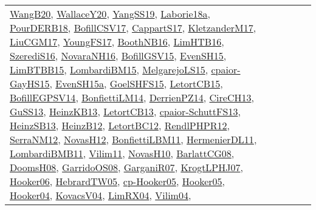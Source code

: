 {\begin{longtable}{llp{6cm}p{6cm}p{6cm}}
\href{papers/WangB20.pdf}{WangB20}\cite{WangB20}, \href{articles/WallaceY20.pdf}{WallaceY20}\cite{WallaceY20}, \href{papers/YangSS19.pdf}{YangSS19}\cite{YangSS19}, \href{papers/Laborie18a.pdf}{Laborie18a}\cite{Laborie18a}, \href{articles/PourDERB18.pdf}{PourDERB18}\cite{PourDERB18}, \href{papers/BofillCSV17.pdf}{BofillCSV17}\cite{BofillCSV17}, \href{papers/CappartS17.pdf}{CappartS17}\cite{CappartS17}, \href{papers/KletzanderM17.pdf}{KletzanderM17}\cite{KletzanderM17}, \href{papers/LiuCGM17.pdf}{LiuCGM17}\cite{LiuCGM17}, \href{papers/YoungFS17.pdf}{YoungFS17}\cite{YoungFS17}, \href{papers/BoothNB16.pdf}{BoothNB16}\cite{BoothNB16}, \href{papers/LimHTB16.pdf}{LimHTB16}\cite{LimHTB16}, \href{papers/SzerediS16.pdf}{SzerediS16}\cite{SzerediS16}, \href{articles/NovaraNH16.pdf}{NovaraNH16}\cite{NovaraNH16}, \href{papers/BofillGSV15.pdf}{BofillGSV15}\cite{BofillGSV15}, \href{papers/EvenSH15.pdf}{EvenSH15}\cite{EvenSH15}, \href{papers/LimBTBB15.pdf}{LimBTBB15}\cite{LimBTBB15}, \href{papers/LombardiBM15.pdf}{LombardiBM15}\cite{LombardiBM15}, \href{papers/MelgarejoLS15.pdf}{MelgarejoLS15}\cite{MelgarejoLS15}, \href{papers/cpaior-GayHS15.pdf}{cpaior-GayHS15}\cite{cpaior-GayHS15}, \href{articles/EvenSH15a.pdf}{EvenSH15a}\cite{EvenSH15a}, \href{articles/GoelSHFS15.pdf}{GoelSHFS15}\cite{GoelSHFS15}, \href{articles/LetortCB15.pdf}{LetortCB15}\cite{LetortCB15}, \href{papers/BofillEGPSV14.pdf}{BofillEGPSV14}\cite{BofillEGPSV14}, \href{papers/BonfiettiLM14.pdf}{BonfiettiLM14}\cite{BonfiettiLM14}, \href{papers/DerrienPZ14.pdf}{DerrienPZ14}\cite{DerrienPZ14}, \href{papers/CireCH13.pdf}{CireCH13}\cite{CireCH13}, \href{papers/GuSS13.pdf}{GuSS13}\cite{GuSS13}, \href{papers/HeinzKB13.pdf}{HeinzKB13}\cite{HeinzKB13}, \href{papers/LetortCB13.pdf}{LetortCB13}\cite{LetortCB13}, \href{papers/cpaior-SchuttFS13.pdf}{cpaior-SchuttFS13}\cite{cpaior-SchuttFS13}, \href{articles/HeinzSB13.pdf}{HeinzSB13}\cite{HeinzSB13}, \href{papers/HeinzB12.pdf}{HeinzB12}\cite{HeinzB12}, \href{papers/LetortBC12.pdf}{LetortBC12}\cite{LetortBC12}, \href{papers/RendlPHPR12.pdf}{RendlPHPR12}\cite{RendlPHPR12}, \href{papers/SerraNM12.pdf}{SerraNM12}\cite{SerraNM12}, \href{articles/NovasH12.pdf}{NovasH12}\cite{NovasH12}, \href{papers/BonfiettiLBM11.pdf}{BonfiettiLBM11}\cite{BonfiettiLBM11}, \href{papers/HermenierDL11.pdf}{HermenierDL11}\cite{HermenierDL11}, \href{papers/LombardiBMB11.pdf}{LombardiBMB11}\cite{LombardiBMB11}, \href{papers/Vilim11.pdf}{Vilim11}\cite{Vilim11}, \href{articles/NovasH10.pdf}{NovasH10}\cite{NovasH10}, \href{papers/BarlattCG08.pdf}{BarlattCG08}\cite{BarlattCG08}, \href{papers/DoomsH08.pdf}{DoomsH08}\cite{DoomsH08}, \href{articles/GarridoOS08.pdf}{GarridoOS08}\cite{GarridoOS08}, \href{papers/GarganiR07.pdf}{GarganiR07}\cite{GarganiR07}, \href{papers/KrogtLPHJ07.pdf}{KrogtLPHJ07}\cite{KrogtLPHJ07}, \href{articles/Hooker06.pdf}{Hooker06}\cite{Hooker06}, \href{papers/HebrardTW05.pdf}{HebrardTW05}\cite{HebrardTW05}, \href{papers/cp-Hooker05.pdf}{cp-Hooker05}\cite{cp-Hooker05}, \href{articles/Hooker05.pdf}{Hooker05}\cite{Hooker05}, \href{papers/Hooker04.pdf}{Hooker04}\cite{Hooker04}, \href{papers/KovacsV04.pdf}{KovacsV04}\cite{KovacsV04}, \href{papers/LimRX04.pdf}{LimRX04}\cite{LimRX04}, \href{papers/Vilim04.pdf}{Vilim04}\cite{Vilim04}, 
\end{longtable}}
